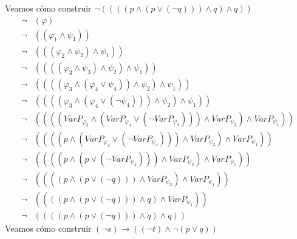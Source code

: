 \documentclass[a4paper]{article}
\begin{document}
Veamos cómo construir \(\neg\left(\left(\left(\left(p \land \left(p \lor \left(\neg q\right)\right)\right) \land q\right) \land q\right)\right)\)
\begin{align*}
    \neg&\left(\varphi\right) \\
    \neg&\left(\left(\varphi_{1} \land \psi_{1}\right)\right) \\
    \neg&\left(\left(\left(\varphi_{2} \land \psi_{2}\right) \land \psi_{1}\right)\right) \\
    \neg&\left(\left(\left(\left(\varphi_{3} \land \psi_{3}\right) \land \psi_{2}\right) \land \psi_{1}\right)\right) \\
    \neg&\left(\left(\left(\left(\varphi_{3} \land \left(\varphi_{4} \lor \psi_{4}\right)\right) \land \psi_{2}\right) \land \psi_{1}\right)\right) \\
    \neg&\left(\left(\left(\left(\varphi_{3} \land \left(\varphi_{4} \lor \left(\neg \psi_{4}\right)\right)\right) \land \psi_{2}\right) \land \psi_{1}\right)\right) \\
    \neg&\left(\left(\left(\left(VarP_{\varphi_{3}} \land \left(VarP_{\varphi_{4}} \lor \left(\neg VarP_{\psi_{4}}\right)\right)\right) \land VarP_{\psi_{2}}\right) \land VarP_{\psi_{1}}\right)\right) \\
    \neg&\left(\left(\left(\left(p \land \left(VarP_{\varphi_{4}} \lor \left(\neg VarP_{\psi_{4}}\right)\right)\right) \land VarP_{\psi_{2}}\right) \land VarP_{\psi_{1}}\right)\right) \\
    \neg&\left(\left(\left(\left(p \land \left(p \lor \left(\neg VarP_{\psi_{4}}\right)\right)\right) \land VarP_{\psi_{2}}\right) \land VarP_{\psi_{1}}\right)\right) \\
    \neg&\left(\left(\left(\left(p \land \left(p \lor \left(\neg q\right)\right)\right) \land VarP_{\psi_{2}}\right) \land VarP_{\psi_{1}}\right)\right) \\
    \neg&\left(\left(\left(\left(p \land \left(p \lor \left(\neg q\right)\right)\right) \land q\right) \land VarP_{\psi_{1}}\right)\right) \\
    \neg&\left(\left(\left(\left(p \land \left(p \lor \left(\neg q\right)\right)\right) \land q\right) \land q\right)\right)
\end{align*}
Veamos cómo construir \(\left(\neg s\right) \rightarrow \left(\left(\neg t\right) \land \neg \left(p \lor q\right) \right)\)
\end{document}
